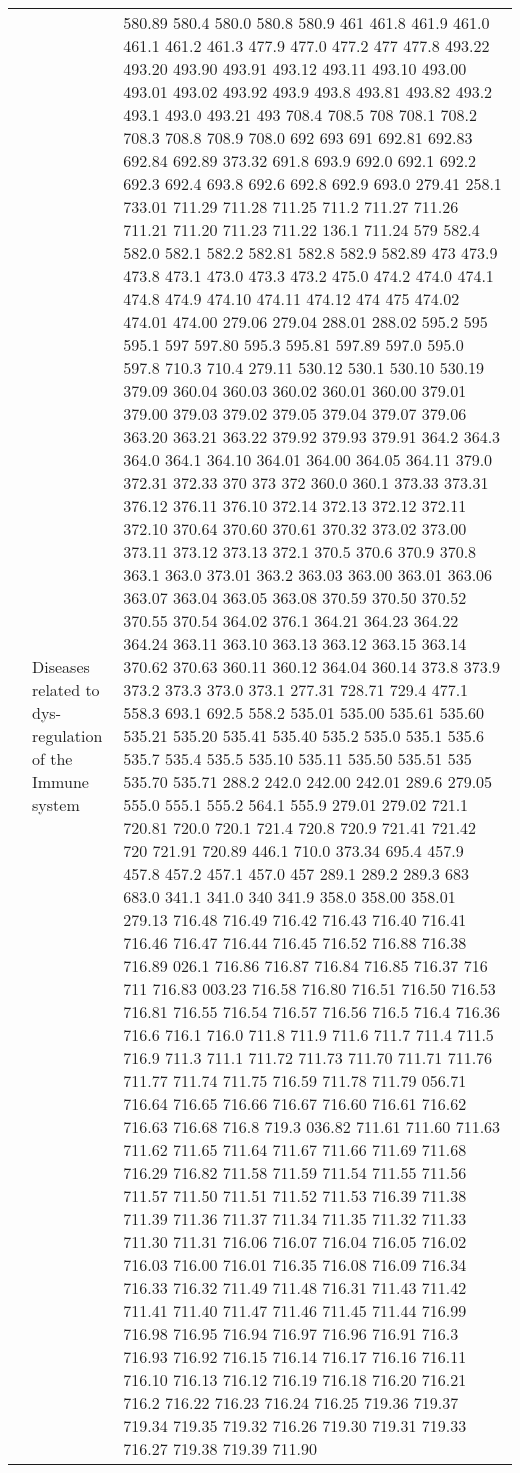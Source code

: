 \begin{longtable}{|R{.05in}|L{.65in}||L{5.65in}|}
   & Diseases related to dys-regulation of the Immune system &   580.89 580.4 580.0 580.8 580.9 461 461.8 461.9 461.0 461.1 461.2 461.3 477.9 477.0 477.2 477 477.8 493.22 493.20 493.90 493.91 493.12 493.11 493.10 493.00 493.01 493.02 493.92 493.9 493.8 493.81 493.82 493.2 493.1 493.0 493.21 493 708.4 708.5 708 708.1 708.2 708.3 708.8 708.9 708.0 692 693 691 692.81 692.83 692.84 692.89 373.32 691.8 693.9 692.0 692.1 692.2 692.3 692.4 693.8 692.6 692.8 692.9 693.0 279.41 258.1 733.01 711.29 711.28 711.25 711.2 711.27 711.26 711.21 711.20 711.23 711.22 136.1 711.24 579 582.4 582.0 582.1 582.2 582.81 582.8 582.9 582.89 473 473.9 473.8 473.1 473.0 473.3 473.2 475.0 474.2 474.0 474.1 474.8 474.9 474.10 474.11 474.12 474 475 474.02 474.01 474.00 279.06 279.04 288.01 288.02 595.2 595 595.1 597 597.80 595.3 595.81 597.89 597.0 595.0 597.8 710.3 710.4 279.11 530.12 530.1 530.10 530.19 379.09 360.04 360.03 360.02 360.01 360.00 379.01 379.00 379.03 379.02 379.05 379.04 379.07 379.06 363.20 363.21 363.22 379.92 379.93 379.91 364.2 364.3 364.0 364.1 364.10 364.01 364.00 364.05 364.11 379.0 372.31 372.33 370 373 372 360.0 360.1 373.33 373.31 376.12 376.11 376.10 372.14 372.13 372.12 372.11 372.10 370.64 370.60 370.61 370.32 373.02 373.00 373.11 373.12 373.13 372.1 370.5 370.6 370.9 370.8 363.1 363.0 373.01 363.2 363.03 363.00 363.01 363.06 363.07 363.04 363.05 363.08 370.59 370.50 370.52 370.55 370.54 364.02 376.1 364.21 364.23 364.22 364.24 363.11 363.10 363.13 363.12 363.15 363.14 370.62 370.63 360.11 360.12 364.04 360.14 373.8 373.9 373.2 373.3 373.0 373.1 277.31 728.71 729.4 477.1 558.3 693.1 692.5 558.2 535.01 535.00 535.61 535.60 535.21 535.20 535.41 535.40 535.2 535.0 535.1 535.6 535.7 535.4 535.5 535.10 535.11 535.50 535.51 535 535.70 535.71 288.2 242.0 242.00 242.01 289.6 279.05 555.0 555.1 555.2 564.1 555.9 279.01 279.02 721.1 720.81 720.0 720.1 721.4 720.8 720.9 721.41 721.42 720 721.91 720.89 446.1 710.0 373.34 695.4 457.9 457.8 457.2 457.1 457.0 457 289.1 289.2 289.3 683 683.0 341.1 341.0 340 341.9 358.0 358.00 358.01 279.13 716.48 716.49 716.42 716.43 716.40 716.41 716.46 716.47 716.44 716.45 716.52 716.88 716.38 716.89 026.1 716.86 716.87 716.84 716.85 716.37 716 711 716.83 003.23 716.58 716.80 716.51 716.50 716.53 716.81 716.55 716.54 716.57 716.56 716.5 716.4 716.36 716.6 716.1 716.0 711.8 711.9 711.6 711.7 711.4 711.5 716.9 711.3 711.1 711.72 711.73 711.70 711.71 711.76 711.77 711.74 711.75 716.59 711.78 711.79 056.71 716.64 716.65 716.66 716.67 716.60 716.61 716.62 716.63 716.68 716.8 719.3 036.82 711.61 711.60 711.63 711.62 711.65 711.64 711.67 711.66 711.69 711.68 716.29 716.82 711.58 711.59 711.54 711.55 711.56 711.57 711.50 711.51 711.52 711.53 716.39 711.38 711.39 711.36 711.37 711.34 711.35 711.32 711.33 711.30 711.31 716.06 716.07 716.04 716.05 716.02 716.03 716.00 716.01 716.35 716.08 716.09 716.34 716.33 716.32 711.49 711.48 716.31 711.43 711.42 711.41 711.40 711.47 711.46 711.45 711.44 716.99 716.98 716.95 716.94 716.97 716.96 716.91 716.3 716.93 716.92 716.15 716.14 716.17 716.16 716.11 716.10 716.13 716.12 716.19 716.18 716.20 716.21 716.2 716.22 716.23 716.24 716.25 719.36 719.37 719.34 719.35 719.32 716.26 719.30 719.31 719.33 716.27 719.38 719.39 711.90 
\end{longtable}
